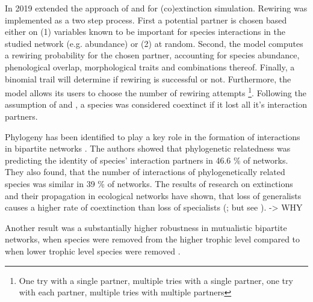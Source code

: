 \documentclass[12pt,a4paper]{article}
\begin{document}
In 2019 \citeauthor{Vizentin-Bugoni2019} extended the approach of \citeauthor{Memmott2004} and \citeauthor{Dunne2002} \parencite{Memmott2004, Dunne2002} for (co)extinction simulation.
Rewiring was implemented as a two step process. First a potential partner is chosen based either on (1) variables known to be important for species interactions in the studied network (e.g. abundance) or (2) at random. Second, the model computes a rewiring probability for the chosen partner, accounting for species abundance, phenological overlap, morphological traits and combinations thereof. Finally, a binomial trail will determine if rewiring is successful or not. Furthermore, the model allows its users to choose the number of rewiring attempts \footnote{
One try with a single partner, 
multiple tries with a single partner, 
one try with each partner, 
multiple tries with multiple partners
}. Following the assumption of \citeauthor{Memmott2004} and \citeauthor{Dunne2002}, a species was considered coextinct if it lost all it's interaction partners.
\par

Phylogeny has been identified to play a key role in the formation of interactions in bipartite networks \parencite{Rezende2007}. The authors showed that phylogenetic relatedness was predicting the identity of species' interaction partners in 46.6 \% of networks. They also found, that the number of interactions of phylogenetically related species was similar in 39 \% of networks.
The results of research on extinctions and their propagation in ecological networks have shown, that loss of generalists causes a higher rate of coextinction than loss of specialists (\cite{Memmott2004, Kaiser-Bunbury2010, Traveset2017, Bastazini2018, Vizentin-Bugoni2019, Biella2020}; but see \cite{Dunne2002}). 
-> WHY

Another result was a substantially higher robustness in mutualistic bipartite networks, when species were removed from the higher trophic level compared to when lower trophic level species were removed \parencite{Schleuning2016}.

\end{document}
